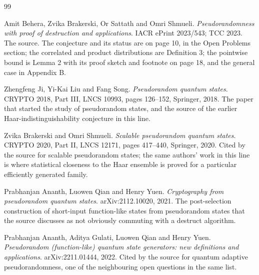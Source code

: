 \documentclass{aicr-conjecture}
\begin{document}
\begin{aicrbibliography}{99}

Amit Behera, Zvika Brakerski, Or Sattath and Omri Shmueli.
\emph{Pseudorandomness with proof of destruction and applications}.
IACR ePrint 2023/543; TCC 2023.
The source. The conjecture and its status are on page 10, in the Open
Problems section; the correlated and product distributions are
Definition 3; the pointwise bound is Lemma 2 with its proof sketch and
footnote on page 18, and the general case in Appendix B.

Zhengfeng Ji, Yi-Kai Liu and Fang Song.
\emph{Pseudorandom quantum states}.
CRYPTO 2018, Part III, LNCS 10993, pages 126--152, Springer, 2018.
The paper that started the study of pseudorandom states, and the source
of the earlier Haar-indistinguishability conjecture in this line.

Zvika Brakerski and Omri Shmueli.
\emph{Scalable pseudorandom quantum states}.
CRYPTO 2020, Part II, LNCS 12171, pages 417--440, Springer, 2020.
Cited by the source for scalable pseudorandom states; the same authors'
work in this line is where statistical closeness to the Haar ensemble is
proved for a particular efficiently generated family.

Prabhanjan Ananth, Luowen Qian and Henry Yuen.
\emph{Cryptography from pseudorandom quantum states}.
arXiv:2112.10020, 2021.
The post-selection construction of short-input function-like states from
pseudorandom states that the source discusses as not obviously commuting
with a destruct algorithm.

Prabhanjan Ananth, Aditya Gulati, Luowen Qian and Henry Yuen.
\emph{Pseudorandom (function-like) quantum state generators: new
definitions and applications}.
arXiv:2211.01444, 2022.
Cited by the source for quantum adaptive pseudorandomness, one of the
neighbouring open questions in the same list.

\end{aicrbibliography}
\end{document}
